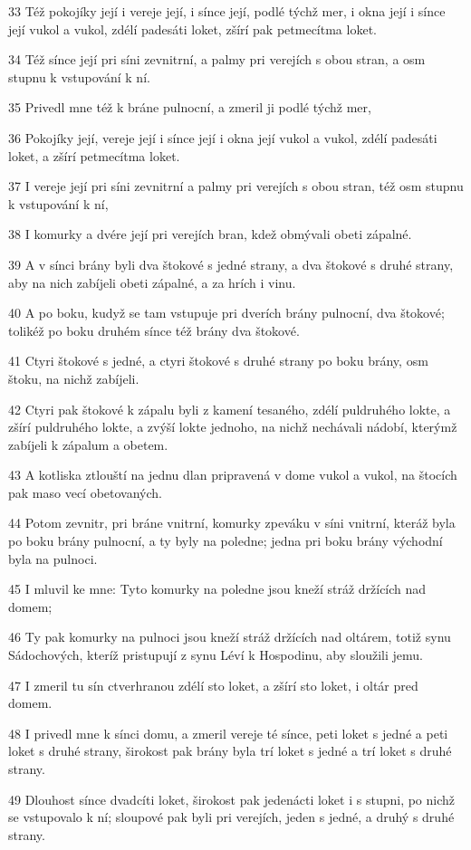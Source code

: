 \par 33 Též pokojíky její i vereje její, i sínce její, podlé týchž mer, i okna její i sínce její vukol a vukol, zdélí padesáti loket, zšírí pak petmecítma loket.
\par 34 Též sínce její pri síni zevnitrní, a palmy pri verejích s obou stran, a osm stupnu k vstupování k ní.
\par 35 Privedl mne též k bráne pulnocní, a zmeril ji podlé týchž mer,
\par 36 Pokojíky její, vereje její i sínce její i okna její vukol a vukol, zdélí padesáti loket, a zšírí petmecítma loket.
\par 37 I vereje její pri síni zevnitrní a palmy pri verejích s obou stran, též osm stupnu k vstupování k ní,
\par 38 I komurky a dvére její pri verejích bran, kdež obmývali obeti zápalné.
\par 39 A v sínci brány byli dva štokové s jedné strany, a dva štokové s druhé strany, aby na nich zabíjeli obeti zápalné, a za hrích i vinu.
\par 40 A po boku, kudyž se tam vstupuje pri dverích brány pulnocní, dva štokové; tolikéž po boku druhém sínce též brány dva štokové.
\par 41 Ctyri štokové s jedné, a ctyri štokové s druhé strany po boku brány, osm štoku, na nichž zabíjeli.
\par 42 Ctyri pak štokové k zápalu byli z kamení tesaného, zdélí puldruhého lokte, a zšírí puldruhého lokte, a zvýší lokte jednoho, na nichž nechávali nádobí, kterýmž zabíjeli k zápalum a obetem.
\par 43 A kotliska ztlouští na jednu dlan pripravená v dome vukol a vukol, na štocích pak maso vecí obetovaných.
\par 44 Potom zevnitr, pri bráne vnitrní, komurky zpeváku v síni vnitrní, kteráž byla po boku brány pulnocní, a ty byly na poledne; jedna pri boku brány východní byla na pulnoci.
\par 45 I mluvil ke mne: Tyto komurky na poledne jsou kneží stráž držících nad domem;
\par 46 Ty pak komurky na pulnoci jsou kneží stráž držících nad oltárem, totiž synu Sádochových, kteríž pristupují z synu Léví k Hospodinu, aby sloužili jemu.
\par 47 I zmeril tu sín ctverhranou zdélí sto loket, a zšírí sto loket, i oltár pred domem.
\par 48 I privedl mne k sínci domu, a zmeril vereje té sínce, peti loket s jedné a peti loket s druhé strany, širokost pak brány byla trí loket s jedné a trí loket s druhé strany.
\par 49 Dlouhost sínce dvadcíti loket, širokost pak jedenácti loket i s stupni, po nichž se vstupovalo k ní; sloupové pak byli pri verejích, jeden s jedné, a druhý s druhé strany.


